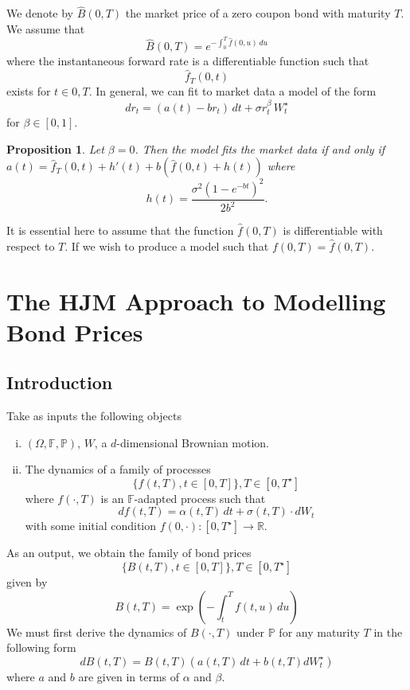 \documentclass[10pt, oneside, reqno]{amsbook}
\theoremstyle{plain}%
\newtheorem{prop}[thm]{Proposition}
\theoremstyle{definition}
\theoremstyle{remark}
\newcommand{\R}{\mathbb{R}}
\renewcommand{\P}{\mathbb{P}}
\newcommand{\F}{\mathbb{F}}
\numberwithin{equation}{chapter}
\begin{document}
We denote by $\hat B(0, T)$ the market price of a zero coupon bond with maturity $T$.  We assume that \[
	\hat B(0, T) = e^{- \int_0^T \hat f(0, u) \, du}
\] where the instantaneous forward rate  is a differentiable function such that \[
	\hat f_T(0, t) 
\] exists for $t \in 0, T$.  In general, we can fit to market data a model of the form \[
	dr_t = (a(t) - br_t) \, dt + \sigma r_t^\beta \, W^\star_t
\] for $\beta \in [0, 1]$.  

\begin{prop}
	Let $\beta = 0$. Then the model fits the market data if and only if $a(t) = \hat f_T(0, t) + h'(t) + b(\hat f(0, t) + h(t))$ where \[
		h(t) = \frac{\sigma^2\left(1-e^{-bt}\right)^2}{2b^2}.
	\]
\end{prop}
It is essential here to assume that the function $\hat f(0, T)$ is differentiable with respect to $T$.  If we wish to produce a model such that $f(0, T) = \hat f(0, T)$.


\chapter{The HJM Approach to Modelling Bond Prices} %
\label{cha:the_hjm_approach_to_modelling_bond_prices}

\section{Introduction} %
\label{sec:introduction_to_hjm}

Take as inputs the following objects \begin{enumerate}[(i)]
	\item $(\Omega, \F, \P)$, $W$, a $d$-dimensional Brownian motion.
	\item The dynamics of a family of processes \[
		\{ f(t, T), t \in [0, T] \}, T \in [0, T^\star]
	\] where $f(\cdot, T)$ is an $\F$-adapted process such that \[
		df(t, T) = \alpha(t, T) \, dt + \sigma(t, T) \cdot dW_t
	\] with some initial condition $f(0, \cdot) : [0, T^\star] \rightarrow \R$.  
\end{enumerate} As an output, we obtain the family of bond prices \[
	\{ B(t, T), t \in [0, T] \}, T \in [0, T^\star]
\] given by \[
	B(t, T) = \exp \left(-\int_t^T f(t, u) \, du \right)
\]  We must first derive the dynamics of $B(\cdot, T)$ under $\P$ for any maturity $T$ in the following form \[
	dB(t, T) = B(t, T) \left( a(t, T) \, dt + b(t, T) dW^\star_t \right)
\] where $a$ and $b$ are given in terms of $\alpha$ and $\beta$.  
\end{document}
